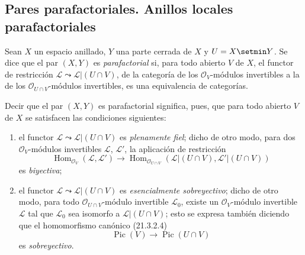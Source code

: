 \subsection{Pares parafactoriales. Anillos locales parafactoriales}
\label{subsection:IV.21.13}
\label{IV.21.13}

\begin{definition}[21.13.1]
\label{IV.21.13.1}
Sean $X$ un espacio anillado, $Y$ una parte cerrada de $X$ y $U=X\setmin Y$.
Se dice que el par $(X,Y)$ es \emph{parafactorial} si, para todo abierto $V$ de $X$,
el functor de restricción
$\mathscr L\leadsto\mathscr L|(U\cap V)$, de la categoría de los
$\mathcal O_V$-módulos invertibles a la de los $\mathcal O_{U\cap V}$-módulos
invertibles, es una equivalencia de categorías.
\end{definition}

Decir que el par $(X,Y)$ es parafactorial significa, pues, que para todo abierto $V$
de $X$ se satisfacen las condiciones siguientes:
\begin{enumerate}[label=\arabic*\textsuperscript{o}]
  \item el functor $\mathscr L\leadsto\mathscr L|(U\cap V)$ es \emph{plenamente
  fiel}; dicho de otro modo, para dos $\mathcal O_V$-módulos invertibles $\mathscr L$,
  $\mathscr L'$, la aplicación de restricción
  \[
    \operatorname{Hom}_{\mathcal O_V}(\mathscr L,\mathscr L')
    \longrightarrow
    \operatorname{Hom}_{\mathcal O_{U\cap V}}
    (\mathscr L|(U\cap V),\mathscr L'|(U\cap V))
  \]
  es \emph{biyectiva};
  \item el functor $\mathscr L\leadsto\mathscr L|(U\cap V)$ es
  \emph{esencialmente sobreyectivo}; dicho de otro modo, para todo
  $\mathcal O_{U\cap V}$-módulo invertible $\mathscr L_0$, existe un
  $\mathcal O_V$-módulo invertible $\mathscr L$ tal que $\mathscr L_0$ sea
  isomorfo a $\mathscr L|(U\cap V)$; esto se expresa también diciendo que
  el homomorfismo canónico (21.3.2.4)
  \[
    \operatorname{Pic}(V)\longrightarrow\operatorname{Pic}(U\cap V)
  \]
  es \emph{sobreyectivo}.
\end{enumerate}

